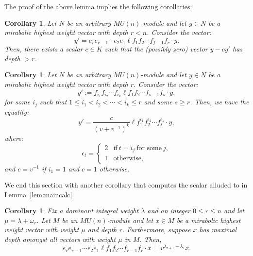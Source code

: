 \documentclass{amsart}
\numberwithin{equation}{section}
\theoremstyle{theorem}
\newtheorem{corollary}[theorem]{Corollary}
\theoremstyle{definition}
\newcommand{\eps}{\epsilon}
\begin{document}
The proof of the above lemma implies the following corollaries:

\begin{corollary} \label{cor:depth-increase}
Let $N$ be an arbitrary $MU(n)$-module and let $y\in N$ be a mirabolic highest weight vector with depth $r<n$. Consider the vector:
\[y'=e_re_{r-1}\cdots e_2e_1\ell f_1f_2\cdots f_{f-1}f_r\cdot y.\]
Then, there exists a scalar $c\in K$ such that the (possibly zero) vector $y-cy'$ has depth $>r$.
\end{corollary}

\begin{corollary} \label{cor:fmove}
Let $N$ be an arbitrary $MU(n)$-module and let $y\in N$ be a mirabolic highest weight vector with depth $r$. Consider the vector:
\[y':= f_{i_1} f_{i_2}\cdots f_{i_k}  \ell f_1 f_2\cdots f_{s-1} f_{s} \cdot y,\]
for some $i_j$ such that $1\leq i_1< i_2<\cdots <i_k\leq r$ and some $s\geq r$. Then, we have the equality:
\[y'=  \frac{c}{(v+v^{-1})^k}\ell  f_1^{\eps_1}  f_2^{\eps_2} \cdots f_s^{\eps_s} \cdot y,\]
where:
\[\eps_t=\begin{cases}2 & \text{if}~t=i_j~\text{for some}~j,\\1 &\text{otherwise},\end{cases}\]
and $c=v^{-1}$ if $i_1=1$ and $c=1$ otherwise.
\end{corollary}

We end this section with another corollary that computes the scalar alluded to in Lemma~\ref{lem:maincalc}.
\begin{corollary} \label{cor:char-chi}
Fix a dominant integral weight $\lambda$ and an integer $0\leq r\leq n$ and let $\mu=\lambda+\omega_r$. Let $M$ be an $MU(n)$-module and let $x\in M$ be a mirabolic highest weight vector with weight $\mu$ and depth $r$. Furthermore, suppose $x$ has maximal depth amongst all vectors with weight $\mu$ in $M$. Then,
\[e_{r}e_{r - 1}\cdots e_2e_1 \ell f_1 f_2\cdots f_{r-1} f_{r} \cdot x=v^{\lambda_{r+1}-\lambda_1}x.\]
\end{corollary}
\end{document}
